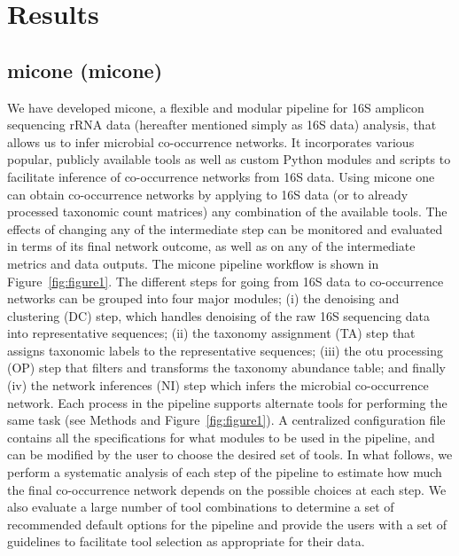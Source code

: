 
\section*{Results}

  \subsection*{\acl{micone} (\acs{micone})}

  We have developed \ac{micone}, a flexible and modular pipeline for 16S amplicon sequencing rRNA data (hereafter mentioned simply as 16S data) analysis, that allows us to infer microbial co-occurrence networks.
  It incorporates various popular, publicly available tools as well as custom Python modules and scripts to facilitate inference of co-occurrence networks from 16S data.
  Using \ac{micone} one can obtain co-occurrence networks by applying to 16S data (or to already processed taxonomic count matrices) any combination of the available tools.
  The effects of changing any of the intermediate step can be monitored and evaluated in terms of its final network outcome, as well as on any of the intermediate metrics and data outputs.
  The \ac{micone} pipeline workflow is shown in Figure~\ref{fig:figure1}.
  The different steps for going from 16S data to co-occurrence networks can be grouped into four major modules; (i) the denoising and clustering (DC) step, which handles denoising of the raw 16S sequencing data into representative sequences; (ii) the taxonomy assignment (TA) step that assigns taxonomic labels to the representative sequences; (iii) the \ac{otu} processing (OP) step that filters and transforms the taxonomy abundance table; and finally (iv) the network inferences (NI) step which infers the microbial co-occurrence network.
  Each process in the pipeline supports alternate tools for performing the same task (see Methods and Figure~\ref{fig:figure1}).
  A centralized configuration file contains all the specifications for what modules to be used in the pipeline, and can be modified by the user to choose the desired set of tools.
  In what follows, we perform a systematic analysis of each step of the pipeline to estimate how much the final co-occurrence network depends on the possible choices at each step.
  We also evaluate a large number of tool combinations to determine a set of recommended default options for the pipeline and provide the users with a set of guidelines to facilitate tool selection as appropriate for their data.

